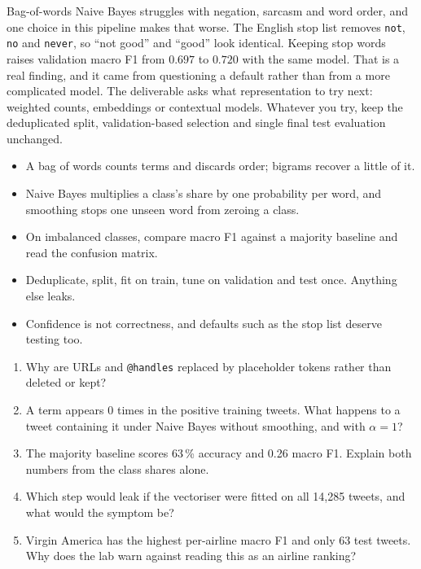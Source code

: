 Bag-of-words Naive Bayes struggles with negation, sarcasm and word order, and one choice in this pipeline makes that worse. The English stop list removes \texttt{not}, \texttt{no} and \texttt{never}, so ``not good'' and ``good'' look identical. Keeping stop words raises validation macro F1 from $0.697$ to $0.720$ with the same model. That is a real finding, and it came from questioning a default rather than from a more complicated model. The deliverable asks what representation to try next: weighted counts, embeddings or contextual models. Whatever you try, keep the deduplicated split, validation-based selection and single final test evaluation unchanged.

\begin{chapterrecap}
\begin{itemize}
  \item A bag of words counts terms and discards order; bigrams recover a little of it.
  \item Naive Bayes multiplies a class's share by one probability per word, and smoothing stops one unseen word from zeroing a class.
  \item On imbalanced classes, compare macro F1 against a majority baseline and read the confusion matrix.
  \item Deduplicate, split, fit on train, tune on validation and test once. Anything else leaks.
  \item Confidence is not correctness, and defaults such as the stop list deserve testing too.
\end{itemize}
\end{chapterrecap}

\begin{quickcheck}
\begin{enumerate}
  \item Why are URLs and \texttt{@handles} replaced by placeholder tokens rather than deleted or kept?
  \item A term appears 0 times in the positive training tweets. What happens to a tweet containing it under Naive Bayes without smoothing, and with $\alpha=1$?
  \item The majority baseline scores 63\,\% accuracy and 0.26 macro F1. Explain both numbers from the class shares alone.
  \item Which step would leak if the vectoriser were fitted on all 14,285 tweets, and what would the symptom be?
  \item Virgin America has the highest per-airline macro F1 and only 63 test tweets. Why does the lab warn against reading this as an airline ranking?
\end{enumerate}
\end{quickcheck}

